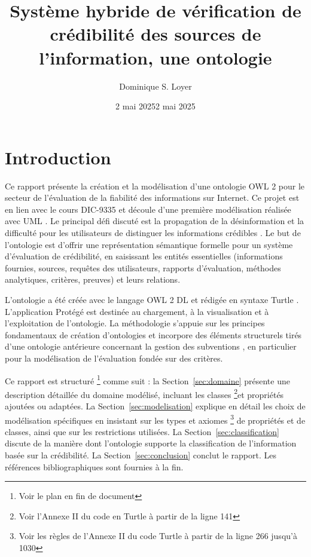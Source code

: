 \documentclass[9pt,twocolumn,twoside,french]{article}
\date{2 mai 2025}
\title{Système hybride de vérification de crédibilité des sources de l'information, une ontologie}
\author{Dominique S. Loyer}
\affil[UQAM]{Projet à l'intention du Professeur Petko Valchev, dans le cadre d'un cours de doctorat, Sciences du Web DIC-9335}
\affil[@]{loyer.dominique@courrier.uqam.ca}
\date{2 mai 2025} %
\begin{document}
\maketitle
\section{Introduction}

Ce rapport présente la création et la modélisation d'une ontologie OWL 2 \parencite{W3C2011Owl} pour le secteur de l'évaluation de la fiabilité des informations sur Internet. Ce projet est en lien avec le cours DIC-9335 et découle d'une première modélisation réalisée avec UML \parencite{Loyer2004Projet, Fowler1998Uml, Larman2004Applying}. Le principal défi discuté est la propagation de la désinformation et la difficulté pour les utilisateurs de distinguer les informations crédibles \parencite{Zhou2022A, Viviani2017, Metzger2010}. Le but de l'ontologie est d'offrir une représentation sémantique formelle pour un système d'évaluation de crédibilité, en saisissant les entités essentielles (informations fournies, sources, requêtes des utilisateurs, rapports d'évaluation, méthodes analytiques, critères, preuves) et leurs relations. 

L'ontologie a été créée avec le langage OWL 2 DL et rédigée en syntaxe Turtle \parencite{TurtleSpec}. L'application Protégé \parencite{The2013Protg} est destinée au chargement, à la visualisation et à l'exploitation de l'ontologie. La méthodologie s'appuie sur les principes fondamentaux de création d'ontologies \parencite{NoyMcGuinness2001} et incorpore des éléments structurels tirés d'une ontologie antérieure concernant la gestion des subventions \parencite{Loyer2018Rapport}, en particulier pour la modélisation de l'évaluation fondée sur des critères. 



Ce rapport est structuré \footnote{Voir le plan en fin de document} comme suit : la Section~\ref{sec:domaine} présente une description détaillée du domaine modélisé, incluant les classes \footnote{Voir l'Annexe II du code en Turtle à partir de la ligne 141}et propriétés ajoutées ou adaptées. La Section~\ref{sec:modelisation} explique en détail les choix de modélisation spécifiques en insistant sur les types et axiomes \footnote{Voir les règles de l'Annexe II du code Turtle à partir de la ligne 266 jusqu'à 1030} de propriétés et de classes, ainsi que sur les restrictions utilisées. La Section~\ref{sec:classification} discute de la manière dont l'ontologie supporte la classification de l'information basée sur la crédibilité. La Section~\ref{sec:conclusion} conclut le rapport. Les références bibliographiques sont fournies à la fin.
\end{document}
